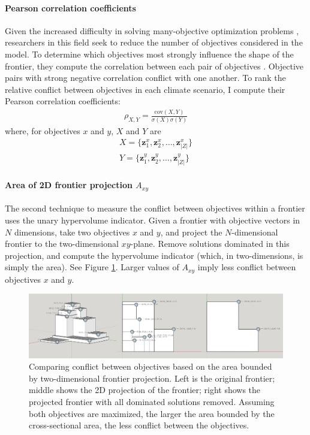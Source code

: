 \paragraph{Pearson correlation coefficients} Given the increased difficulty in solving many-objective optimization problems \cite{khare2003performance}, researchers in this field seek to reduce the number of objectives considered in the model. To determine which objectives most strongly influence the shape of the frontier, they compute the correlation between each pair of objectives \cite{deb2005finding}. Objective pairs with strong negative correlation conflict with one another. To rank the relative conflict between objectives in each climate scenario, I compute their Pearson correlation coefficients:
\begin{align}
\rho_{X,Y} = \frac{\text{cov}(X,Y)}{\sigma(X)\sigma(Y)}
\end{align}
where, for objectives $x$ and $y$, $X$ and $Y$ are
\begin{align}
X = \{ \mathbf{z}^x_1, \mathbf{z}^x_2, \ldots, \mathbf{z}^x_{|Z|} \} \\
Y = \{ \mathbf{z}^y_1, \mathbf{z}^y_2, \ldots, \mathbf{z}^y_{|Z|} \}
\end{align}

\paragraph{Area of 2D frontier projection $A_{xy}$}
The second technique to measure the conflict between objectives within a frontier uses the unary hypervolume indicator. Given a frontier with objective vectors in $N$ dimensions, take two objectives $x$ and $y$, and project the $N$-dimensional frontier to the two-dimensional $xy$-plane. Remove solutions dominated in this projection, and compute the hypervolume indicator (which, in two-dimensions, is simply the area). See Figure \ref{fig:frontierCrossSection}. Larger values of $A_{xy}$ imply less conflict between objectives $x$ and $y$.

\begin{figure}[ht]
\centering
\includegraphics[width=\textwidth]{../images/CrossSection2D}
\caption[Area of 2D frontier projection]{Comparing conflict between objectives based on the area bounded by two-dimensional frontier projection. Left is the original frontier; middle shows the 2D projection of the frontier; right shows the projected frontier with all dominated solutions removed. Assuming both objectives are maximized, the larger the area bounded by the cross-sectional area, the less conflict between the objectives.}
\label{fig:frontierCrossSection}
\end{figure}